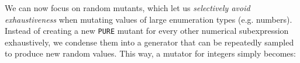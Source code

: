 \documentclass[sigconf,review,anonymous]{acmart}
\newcommand\mydots{\hbox to 0.75em{.\hss.\hss.}}
\newcommand{\mutagen}{\textsc{Mutagen}\xspace}
\begin{document}






%
We can now focus on random mutants, which let us \emph{selectively avoid
exhaustiveness} when mutating values of large enumeration types (e.g. numbers).
%
%
Instead of creating a new \texttt{PURE} mutant for every other numerical
subexpression exhaustively, we condense them into a generator that can be
repeatedly sampled to produce new random values.   
%
%
This way, a mutator for integers simply becomes:
\end{document}
